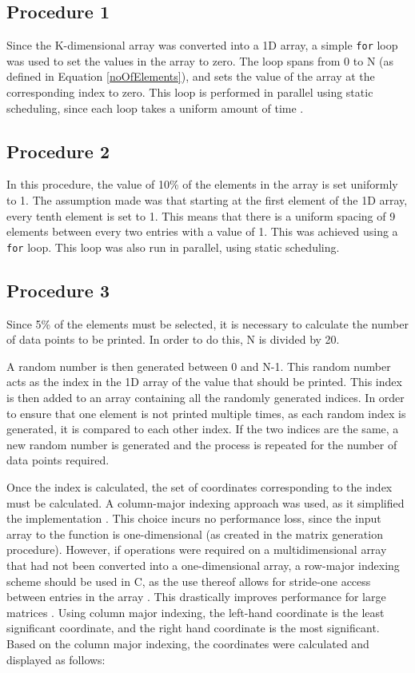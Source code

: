 \documentclass[10pt,twocolumn]{witseiepaper}
\begin{document}
\subsection{Procedure 1}
Since the K-dimensional array was converted into a 1D array, a simple \texttt{for} loop was used to set the values in the array to zero. The loop spans from 0 to N (as defined in Equation \ref{noOfElements}), and sets the value of the array at the corresponding index to zero. This loop is performed in parallel using static scheduling, since each loop takes a uniform amount of time \cite{HPC}.

\subsection{Procedure 2}
In this procedure, the value of 10\% of the elements in the array is set uniformly to 1. The assumption made was that starting at the first element of the 1D array, every tenth element is set to 1. This means that there is a uniform spacing of 9 elements between every two entries with a value of 1. This was achieved using a \texttt{for} loop. This loop was also run in parallel, using static scheduling. 

\subsection{Procedure 3}
Since 5\% of the elements must be selected, it is necessary to calculate the number of data points to be printed. In order to do this, N is divided by 20.

A random number is then generated between 0 and N-1. This random number acts as the index in the 1D array of the value that should be printed. This index is then added to an array containing all the randomly generated indices. In order to ensure that one element is not printed multiple times, as each random index is generated, it is compared to each other index. If the two indices are the same, a new random number is generated and the process is repeated for the number of data points required.

Once the index is calculated, the set of coordinates corresponding to the index must be calculated. A column-major indexing approach was used, as it simplified the implementation \cite{HPC}. This choice incurs no performance loss, since the input array to the function is one-dimensional (as created in the matrix generation procedure). However, if operations were required on a multidimensional array that had not been converted into a one-dimensional array, a row-major indexing scheme should be used in C, as the use thereof allows for stride-one access between entries in the array \cite{HPC}. This drastically improves performance for large matrices \cite{HPC}. Using column major indexing, the left-hand coordinate is the least significant coordinate, and the right hand coordinate is the most significant. Based on the column major indexing, the coordinates were calculated and displayed as follows:
\end{document}
